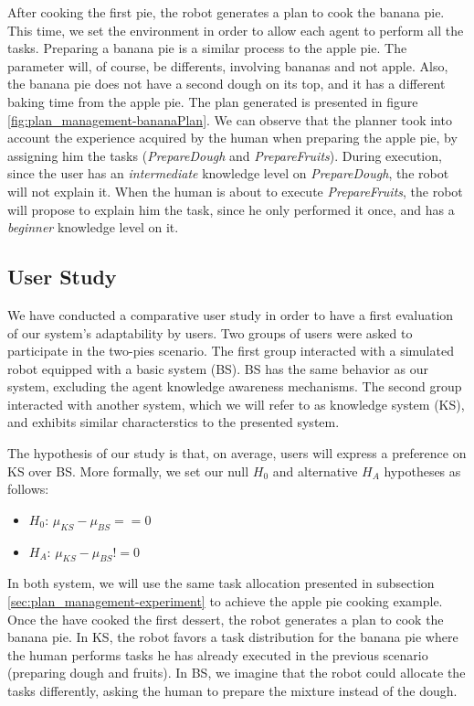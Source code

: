 After cooking the first pie, the robot generates a plan to cook the banana pie. This time, we set the environment in order to allow  each agent to perform all the tasks. Preparing a banana pie is a similar process to the apple pie. The parameter will, of course, be differents, involving bananas and not apple. Also, the banana pie does not have a second dough on its top, and it has a different baking time from the apple pie. The plan generated is presented in figure \ref{fig:plan_management-bananaPlan}. We can observe that the planner took into account the experience acquired by the human when preparing the apple pie, by assigning him the tasks (\textit{PrepareDough} and \textit{PrepareFruits}). During execution, since the user has an \textit{intermediate} knowledge level on \textit{PrepareDough}, the robot will not explain it. When the human is about to execute \textit{PrepareFruits}, the robot will propose to explain him the task, since he only performed it once, and has a \textit{beginner} knowledge level on it.


\subsection{User Study}
We have conducted a comparative user study in order to have a first evaluation of our system's adaptability by users. Two groups of users were asked to participate in the two-pies scenario. The first group interacted with a simulated robot equipped with a basic system (BS). BS has the same behavior as our system, excluding the agent knowledge awareness mechanisms. The second group interacted with another system, which we will refer to as knowledge system (KS), and exhibits similar characterstics to the presented system.

The hypothesis of our study is that, on average, users will express a preference on KS over BS. More formally, we set our null $H_0$ and alternative $H_A$ hypotheses as follows:
\begin{itemize}
\item $H_0$: $\mu_{KS}-\mu_{BS}==0$ 
\item $H_A$: $\mu_{KS}-\mu_{BS}!=0$  
\end{itemize}


In both system, we will use the same task allocation presented in subsection \ref{sec:plan_management-experiment} to achieve the apple pie cooking example. Once the have cooked the first dessert, the robot generates a plan to cook the banana pie. 
In KS,  the robot favors a task distribution for the banana pie where the human performs tasks he has already executed in the previous scenario (preparing dough and fruits).
In BS, we imagine that the robot could allocate the tasks differently, asking the human to prepare the mixture instead of the dough.


